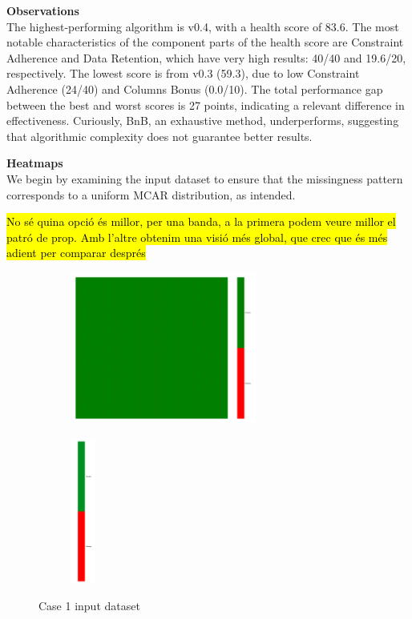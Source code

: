 \documentclass[a4paper,12pt]{article}
\begin{document}
\textbf{Observations}\\
The highest-performing algorithm is v0.4, with a health score of 83.6. The most notable characteristics of the component parts of the health score are Constraint Adherence and Data Retention, which have very high results: 40/40 and 19.6/20, respectively. The lowest score is from v0.3 (59.3), due to low Constraint Adherence (24/40) and Columns Bonus (0.0/10). The total performance gap between the best and worst scores is 27 points, indicating a relevant difference in effectiveness. Curiously, BnB, an exhaustive method, underperforms, suggesting that algorithmic complexity does not guarantee better results.

\textbf{Heatmaps}\\
We begin by examining the input dataset to ensure that the missingness pattern corresponds to a uniform MCAR distribution, as intended.

\hl{No sé quina opció és millor, per una banda, a la primera podem veure millor el patró de prop. Amb l'altre obtenim una visió més global, que crec que és més adient per comparar després}

\begin{figure}[H]
    \centering
    \begin{subfigure}[t]{0.48\linewidth}
        \centering
        \includegraphics[height=5cm, trim=0 600 700 0, clip]{case1_heatmap_erased.png}
    \end{subfigure}
    \hspace{-0.8cm} %
    \begin{subfigure}[t]{0.05\linewidth}
        \centering
        \includegraphics[height=4.8cm]{legend.png}
    \end{subfigure}
    \caption{Case 1 input dataset}
\end{figure}
\end{document}
